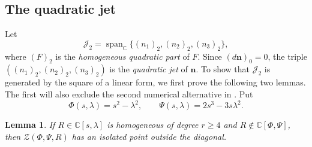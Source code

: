 \documentclass[11pt,letterpaper]{article}
\numberwithin{equation}{section}
\newtheorem{lemma}[lemma]{Lemma}
\theoremstyle{remark}
\theoremstyle{plain}
\newcommand{\C}{\mathbb{C}}
\begin{document}
\subsection{The quadratic jet}

Let
\[
 \mathcal J_2=\operatorname{span}_{\C}
 \{(n_1)_2,(n_2)_2,(n_3)_2\},
\]
where $(F)_2$ is the \emph{homogeneous quadratic part} of $F$.
Since $(d\boldsymbol n)_0=0$, the triple
$((n_1)_2,(n_2)_2,(n_3)_2)$ is the \emph{quadratic jet}
of $\boldsymbol n$.
To show that $\mathcal J_2$ is generated by the square of a linear form,
we first prove the following two lemmas.  The first will also exclude the second numerical
alternative in .  Put
\begin{equation}
 \Phi(s,\lambda)=s^2-\lambda^2,\qquad
 \Psi(s,\lambda)=2s^3-3s\lambda^2.
 \label{eq:d2-cubic-pair}
\end{equation}

\begin{lemma}
\label{lem:d2-cubic-orbit}
If $R\in\C[s,\lambda]$ is homogeneous of degree $r\geq4$ and
$R\notin\C[\Phi,\Psi]$, then
$\mathcal Z(\Phi,\Psi,R)$ has an isolated point outside the diagonal.
\end{lemma}
\end{document}
